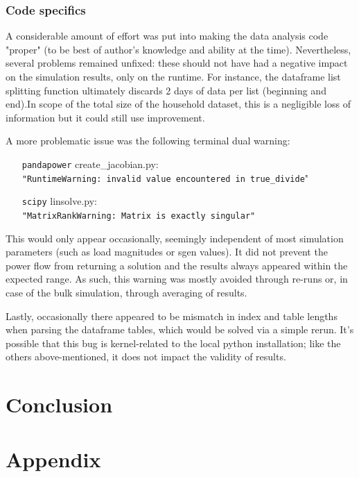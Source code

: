 \documentclass[a4paper,10pt]{report}
\begin{document}
\subsection{Code specifics}
A considerable amount of effort was put into making the data analysis code "proper" (to be best of author's knowledge and ability at the time). Nevertheless, several problems remained unfixed: these should not have had a negative impact on the simulation results, only on the runtime. For instance, the dataframe list splitting function ultimately discards 2 days of data per list (beginning and end).In scope of the total size of the household dataset, this is a negligible loss of information but it could still use improvement.

A more problematic issue was the following terminal dual warning:
\noindent
\begin{itemize}[leftmargin=2.1cm]
	\item[\texttt{pandapower}] create\_jacobian.py:\\
		\texttt{"RuntimeWarning: invalid value encountered in true\_divide}"
	\item[\texttt{scipy}] linsolve.py:\\
		\texttt{"MatrixRankWarning: Matrix is exactly singular"}
\end{itemize}
This would only appear occasionally, seemingly independent of most simulation parameters (such as load magnitudes or sgen values). It did not prevent the power flow from returning a solution and the results always appeared within the expected range. As such, this warning was mostly avoided through re-runs or, in case of the bulk simulation, through averaging of results.

Lastly, occasionally there appeared to be mismatch in index and table lengths when parsing the dataframe tables, which would be solved via a simple rerun. It's possible that this bug is kernel-related to the local python installation; like the others above-mentioned, it does not impact the validity of results.


\chapter{Conclusion}


\chapter*{Appendix}\label{chapter_appendix}
\end{document}
